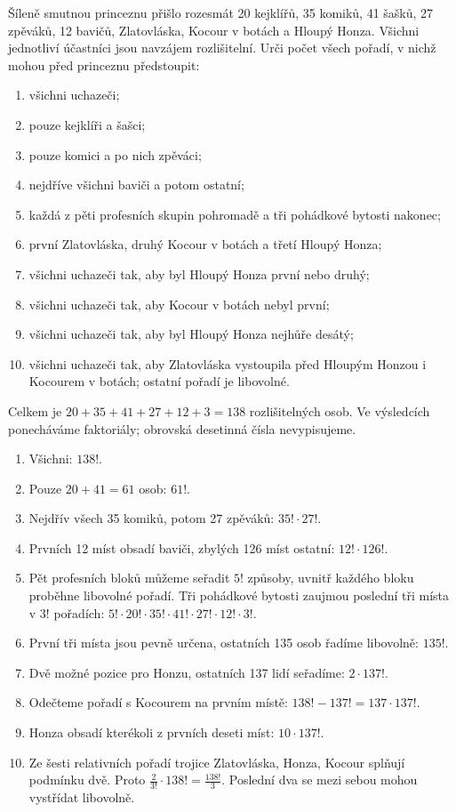 \documentclass[11pt,a4paper]{article}
\begin{document}
\begin{prikladReseniBox}[title={Příklad 2}]
Šíleně smutnou princeznu přišlo rozesmát 20 kejklířů, 35 komiků, 41 šašků, 27 zpěváků, 12 bavičů, Zlatovláska, Kocour v botách a Hloupý Honza. Všichni jednotliví účastníci jsou navzájem rozlišitelní. Urči počet všech pořadí, v nichž mohou před princeznu předstoupit:
\begin{enumerate}[label=\alph*),leftmargin=*,itemsep=1pt]
\item všichni uchazeči;
\item pouze kejklíři a šašci;
\item pouze komici a po nich zpěváci;
\item nejdříve všichni baviči a potom ostatní;
\item každá z pěti profesních skupin pohromadě a tři pohádkové bytosti nakonec;
\item první Zlatovláska, druhý Kocour v botách a třetí Hloupý Honza;
\item všichni uchazeči tak, aby byl Hloupý Honza první nebo druhý;
\item všichni uchazeči tak, aby Kocour v botách nebyl první;
\item všichni uchazeči tak, aby byl Hloupý Honza nejhůře desátý;
\item všichni uchazeči tak, aby Zlatovláska vystoupila před Hloupým Honzou i Kocourem v botách; ostatní pořadí je libovolné.
\end{enumerate}
\tcblower
Celkem je $20+35+41+27+12+3=138$ rozlišitelných osob. Ve výsledcích ponecháváme faktoriály; obrovská desetinná čísla nevypisujeme.
\begin{enumerate}[label=\alph*),leftmargin=*,itemsep=1pt]
\item Všichni: $138!$.
\item Pouze $20+41=61$ osob: $61!$.
\item Nejdřív všech 35 komiků, potom 27 zpěváků: $35!\cdot27!$.
\item Prvních 12 míst obsadí baviči, zbylých 126 míst ostatní: $12!\cdot126!$.
\item Pět profesních bloků můžeme seřadit $5!$ způsoby, uvnitř každého bloku proběhne libovolné pořadí. Tři pohádkové bytosti zaujmou poslední tři místa v $3!$ pořadích:
$5!\cdot20!\cdot35!\cdot41!\cdot27!\cdot12!\cdot3!$.
\item První tři místa jsou pevně určena, ostatních 135 osob řadíme libovolně: $135!$.
\item Dvě možné pozice pro Honzu, ostatních 137 lidí seřadíme: $2\cdot137!$.
\item Odečteme pořadí s Kocourem na prvním místě: $138!-137!=137\cdot137!$.
\item Honza obsadí kterékoli z prvních deseti míst: $10\cdot137!$.
\item Ze šesti relativních pořadí trojice Zlatovláska, Honza, Kocour splňují podmínku dvě. Proto $\frac{2}{3!}\cdot138!=\frac{138!}{3}$. Poslední dva se mezi sebou mohou vystřídat libovolně.
\end{enumerate}
\end{prikladReseniBox}
\end{document}
